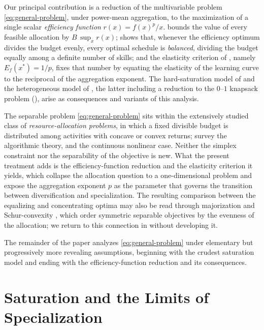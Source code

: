 \documentclass[11pt]{article}
\theoremstyle{definition}
\theoremstyle{remark}
\newcommand{\eff}{r}
\newcommand{\elas}{E}
\begin{document}
Our principal contribution is a reduction of the multivariable problem
\eqref{eq:general-problem}, under power-mean aggregation, to the
maximization of a single scalar \emph{efficiency function}
\(\eff(x)=f(x)^{p}/x\).  bounds the value of
every feasible allocation by \(B\,\sup_{x}\eff(x)\); 
shows that, whenever the efficiency optimum divides the budget evenly,
every optimal schedule is \emph{balanced}, dividing the budget equally
among a definite number of skills; and the elasticity criterion of
, namely \(\elas_{f}(x^{*})=1/p\), fixes that number
by equating the elasticity of the learning curve to the reciprocal of the
aggregation exponent. The hard-saturation model of 
and the heterogeneous model of , the latter
including a reduction to the \(0\)--\(1\) knapsack problem
(), arise as consequences and variants of this
analysis.
 
The separable problem \eqref{eq:general-problem} sits within the
extensively studied class of \emph{resource-allocation problems}, in
which a fixed divisible budget is distributed among activities with
concave or convex returns; \citet{ibaraki1988resource} survey the
algorithmic theory, and \citet{patriksson2008survey} the continuous
nonlinear case. Neither the simplex constraint nor the separability of
the objective is new. What the present treatment adds is the
efficiency-function reduction and the elasticity criterion it yields,
which collapse the allocation question to a one-dimensional problem and
expose the aggregation exponent \(p\) as the parameter that governs the
transition between diversification and specialization. The resulting
comparison between the equalizing and concentrating optima may also be
read through majorization and Schur-convexity
\citep{marshall2011majorization}, which order symmetric separable
objectives by the evenness of the allocation; we return to this
connection in  without developing it.
 
The remainder of the paper analyzes \eqref{eq:general-problem} under
elementary but progressively more revealing assumptions, beginning with
the crudest saturation model and ending with the efficiency-function
reduction and its consequences.
 
\section{Saturation and the Limits of Specialization}
\label{sec:saturation}
\end{document}
